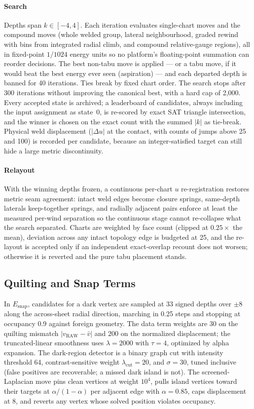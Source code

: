 \paragraph{Search} Depths span $k \in [-4, 4]$. Each iteration evaluates single-chart moves and the compound moves (whole welded group, lateral neighbourhood, graded rewind with bins from integrated radial climb, and compound relative-gauge regions), all in fixed-point $1/1024$ energy units so no platform's floating-point summation can reorder decisions. The best non-tabu move is applied --- or a tabu move, if it would beat the best energy ever seen (aspiration) --- and each departed depth is banned for 40 iterations. Ties break by fixed chart order. The search stops after 300 iterations without improving the canonical best, with a hard cap of 2{,}000. Every accepted state is archived; a leaderboard of candidates, always including the input assignment as state~0, is re-scored by exact SAT triangle intersection, and the winner is chosen on the exact count with the summed $|k|$ as tie-break. Physical weld displacement ($|\Delta u|$ at the contact, with counts of jumps above 25 and 100) is recorded per candidate, because an integer-satisfied target can still hide a large metric discontinuity.

\paragraph{Relayout} With the winning depths frozen, a continuous per-chart $u$ re-registration restores metric seam agreement: intact weld edges become closure springs, same-depth laterals keep-together springs, and radially adjacent pairs enforce at least the measured per-wind separation so the continuous stage cannot re-collapse what the search separated. Charts are weighted by face count (clipped at $0.25\times$ the mean), deviation across any intact topology edge is budgeted at 25, and the re-layout is accepted only if an independent exact-overlap recount does not worsen; otherwise it is reverted and the pure tabu placement stands.

\subsection{Quilting and Snap Terms}
\label{app:snap}

In $E_{\mathrm{snap}}$, candidates for a dark vertex are sampled at 33 signed depths over $\pm8$ along the across-sheet radial direction, marching in 0.25 steps and stopping at occupancy 0.9 against foreign geometry. The data term weights are $30$ on the quilting mismatch $|v_{\mathrm{RAW}} - \bar v|$ and $200$ on the normalized displacement; the truncated-linear smoothness uses $\lambda = 2000$ with $\tau = 4$, optimized by alpha expansion. The dark-region detector is a binary graph cut with intensity threshold 64, contrast-sensitive weight $\lambda_{\mathrm{cut}} = 20$, and $\sigma = 30$, tuned inclusive (false positives are recoverable; a missed dark island is not). The screened-Laplacian move pins clean vertices at weight $10^4$, pulls island vertices toward their targets at $\alpha/(1-\alpha)$ per adjacent edge with $\alpha = 0.85$, caps displacement at 8, and reverts any vertex whose solved position violates occupancy.

